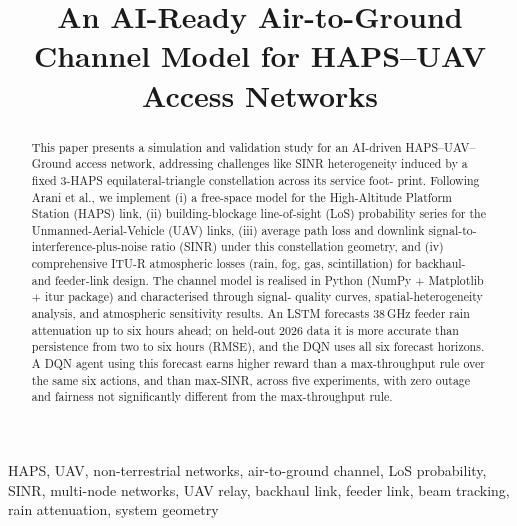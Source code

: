 \documentclass[conference]{IEEEtran}
\begin{document}
\title{An AI-Ready Air-to-Ground Channel Model for HAPS--UAV Access Networks}

\author{
}

\maketitle

\begin{abstract}

This paper presents a simulation and validation
study for an AI-driven HAPS–UAV–Ground access network,
addressing challenges like SINR heterogeneity induced by a fixed
3-HAPS equilateral-triangle constellation across its service foot-
print. Following Arani et al., we implement (i) a free-space model
for the High-Altitude Platform Station (HAPS) link, (ii)
building-blockage line-of-sight (LoS) probability series for the
Unmanned-Aerial-Vehicle (UAV) links, (iii) average
path loss and downlink signal-to-interference-plus-noise ratio
(SINR) under this constellation geometry, and (iv) comprehensive
ITU-R atmospheric losses (rain, fog, gas, scintillation) for backhaul-
and feeder-link design. The channel model is realised in Python (NumPy +
Matplotlib + itur package) and characterised through signal-
quality curves, spatial-heterogeneity analysis, and atmospheric
sensitivity results. An LSTM forecasts 38\,GHz feeder rain attenuation up to six hours ahead; on held-out 2026 data it is more accurate than persistence from two to six hours (RMSE), and the DQN uses all six forecast horizons. A DQN agent using this forecast earns higher reward than a max-throughput rule over the same six actions, and than max-SINR, across five experiments, with zero outage and fairness not significantly different from the max-throughput rule.
\end{abstract}

\begin{IEEEkeywords}
HAPS, UAV, non-terrestrial networks, air-to-ground channel, LoS probability, SINR, multi-node networks, UAV relay, backhaul link, feeder link, beam tracking, rain attenuation, system geometry
\end{IEEEkeywords}

\end{document}
